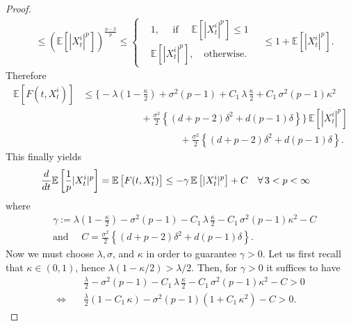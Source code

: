 \documentclass[12pt]{amsart}
\newcommand{\rd}{{\rm d} }
\numberwithin{equation}{section}
\begin{document}
\begin{proof}
\begin{align*}
    & \leq \left(  \mathbb{E}\left[ |X^{i}_{t}|^{p}\right] \right)^{\frac{p-2}{p}} 
    \leq 
    \left\{
        \begin{aligned}
            & 1, \quad \text{ if }\quad \mathbb{E}\left[ |X^{i}_{t}|^{p} \right] \leq 1\\
            & \mathbb{E}\left[ |X^{i}_{t}|^{p} \right], \quad \text{otherwise.}
        \end{aligned}
    \right. \quad
    \leq 1 + \mathbb{E}\left[ |X^{i}_{t}|^{p}\right].
\end{align*}
Therefore 
\begin{align*}
    \mathbb{E}\left[F(t,X^{i}_{t}) \right]
    & \leq \bigg\{ -\lambda\left(1 -\frac{\kappa}{2}\right) + \sigma^{2}(p-1) + C_{1}\,\lambda\,\frac{\kappa}{2} + C_{1}\,\sigma^{2}(p-1)\kappa^{2}\\
    & \quad \quad \quad \quad \quad \quad + \frac{\sigma^{2}}{2}\left\{ (d+p-2)\delta^{2} + d(p-1)\delta\right\} \bigg\}\,\mathbb{E}\left[|X^{i}_{t}|^{p}\right]\\
    & \quad \quad \quad \quad \quad \quad \quad \quad \quad \quad + \frac{\sigma^{2}}{2}\left\{ (d+p-2)\delta^{2} + d(p-1)\delta\right\}.
\end{align*}
This finally yields
\begin{align*}
    \frac{\rd}{\rd t}\mathbb{E}\left[\frac{1}{p}|X^{i}_{t}|^{p}\right] & = \mathbb{E}\left[F(t,X^{i}_{t})\right]
     \leq -\gamma\,\mathbb{E}\left[|X_{t}^{i}|^{p}\right] + C \quad \forall\, 3<p<\infty
\end{align*}
where
\begin{align*}
    & \gamma :=  \lambda\left(1 -\frac{\kappa}{2}\right) - \sigma^{2}(p-1) - C_{1}\,\lambda\,\frac{\kappa}{2} - C_{1}\,\sigma^{2}(p-1)\kappa^{2} - C\\%
    & \text{and } \quad C = \frac{\sigma^{2}}{2}\left\{ (d+p-2)\delta^{2} + d(p-1)\delta\right\}.
\end{align*}
Now we must choose $\lambda,\sigma$, and $\kappa$ in order to guarantee $\gamma>0$. Let us first recall that $\kappa\in (0,1)$, hence $\lambda(1-\kappa/2)>\lambda/2$. Then, for $\gamma>0$ it suffices to have
\begin{align*}
    &  \frac{\lambda}{2} - \sigma^{2}(p-1) - C_{1}\,\lambda\,\frac{\kappa}{2} - C_{1}\,\sigma^{2}(p-1)\kappa^{2} - C >0\\
    \Leftrightarrow \quad & \frac{\lambda}{2}\left(1 -C_{1}\,\kappa\right) - \sigma^{2}(p-1)\left(1+C_{1}\,\kappa^{2}\right) - C >0.

\end{align*}
\end{proof}
\end{document}
